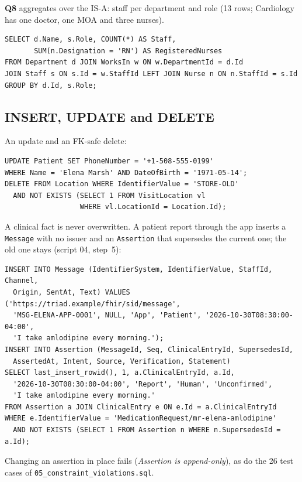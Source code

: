 \documentclass[sigconf]{acmart}
\begin{document}
\noindent \textbf{Q8} aggregates over the IS-A: staff per department and role (13 rows; Cardiology has one doctor, one MOA and three nurses).
\par\noindent\begin{minipage}{\columnwidth}\begin{lstlisting}
SELECT d.Name, s.Role, COUNT(*) AS Staff,
       SUM(n.Designation = 'RN') AS RegisteredNurses
FROM Department d JOIN WorksIn w ON w.DepartmentId = d.Id
JOIN Staff s ON s.Id = w.StaffId LEFT JOIN Nurse n ON n.StaffId = s.Id
GROUP BY d.Id, s.Role;
\end{lstlisting}\end{minipage}\par

\subsection{INSERT, UPDATE and DELETE}
An update and an FK-safe delete:
\par\noindent\begin{minipage}{\columnwidth}\begin{lstlisting}
UPDATE Patient SET PhoneNumber = '+1-508-555-0199'
WHERE Name = 'Elena Marsh' AND DateOfBirth = '1971-05-14';
DELETE FROM Location WHERE IdentifierValue = 'STORE-OLD'
  AND NOT EXISTS (SELECT 1 FROM VisitLocation vl
                  WHERE vl.LocationId = Location.Id);
\end{lstlisting}\end{minipage}\par
\noindent A clinical fact is never overwritten. A patient report through the app inserts a \texttt{Message} with no issuer and an \texttt{Assertion} that supersedes the current one; the old one stays (script 04, step~5):
\par\noindent\begin{minipage}{\columnwidth}\begin{lstlisting}
INSERT INTO Message (IdentifierSystem, IdentifierValue, StaffId, Channel,
  Origin, SentAt, Text) VALUES ('https://triad.example/fhir/sid/message',
  'MSG-ELENA-APP-0001', NULL, 'App', 'Patient', '2026-10-30T08:30:00-04:00',
  'I take amlodipine every morning.');
INSERT INTO Assertion (MessageId, Seq, ClinicalEntryId, SupersedesId,
  AssertedAt, Intent, Source, Verification, Statement)
SELECT last_insert_rowid(), 1, a.ClinicalEntryId, a.Id,
  '2026-10-30T08:30:00-04:00', 'Report', 'Human', 'Unconfirmed',
  'I take amlodipine every morning.'
FROM Assertion a JOIN ClinicalEntry e ON e.Id = a.ClinicalEntryId
WHERE e.IdentifierValue = 'MedicationRequest/mr-elena-amlodipine'
  AND NOT EXISTS (SELECT 1 FROM Assertion n WHERE n.SupersedesId = a.Id);
\end{lstlisting}\end{minipage}\par
\noindent Changing an assertion in place fails (\emph{Assertion is append-only}), as do the 26 test cases of \texttt{05\_constraint\_\allowbreak violations.sql}.
\end{document}
